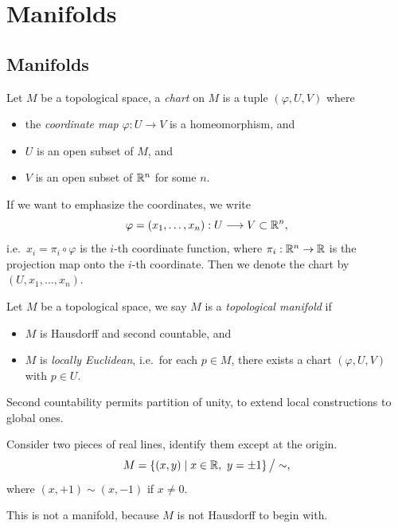 
\chapter{Manifolds}

\section{Manifolds}

\begin{definition}
  Let \(M\) be a topological space, a \emph{chart} on \(M\) is a tuple \((\varphi,U,V)\) where \begin{itemize}
    \item the \emph{coordinate map} \(\varphi:U\to V\) is a homeomorphism, and
    \item \(U\) is an open subset of \(M\), and
    \item \(V\) is an open subset of \(\mathbb{R}^n\) for some \(n\).
  \end{itemize}
  \begin{center}
    
  \end{center}
  If we want to emphasize the coordinates, we write \[
    \varphi = (x_1,\ldots,x_n):U\longrightarrow V\subset\mathbb{R}^n,
  \] i.e.\ \(x_i = \pi_i\circ\varphi\) is the \(i\)-th coordinate function, where \(\pi_i:\mathbb{R}^n\to\mathbb{R}\) is the projection map onto the \(i\)-th coordinate. Then we denote the chart by \((U,x_1,\ldots,x_n)\).
\end{definition}

\begin{definition}
 Let \(M\) be a topological space, we say \(M\) is a \emph{topological manifold} if \begin{itemize}
  \item \(M\) is Hausdorff and second countable, and
  \item \(M\) is \emph{locally Euclidean}, i.e.\ for each \(p\in M\), there exists a chart \((\varphi,U,V)\) with \(p\in U\).
 \end{itemize}
\end{definition}
Second countability permits partition of unity, to extend local constructions to global ones.

\begin{example}
  Consider two pieces of real lines, identify them except at the origin.
  \[
    M = \left\{(x,y)\mid x\in\mathbb{R},\ y = \pm 1\right\} \big/ \sim,
  \] where \((x,+1)\sim (x,-1)\) if \(x\neq 0\).
  \begin{center}
    
  \end{center}
  This is not a manifold, because \(M\) is not Hausdorff to begin with.
\end{example}

